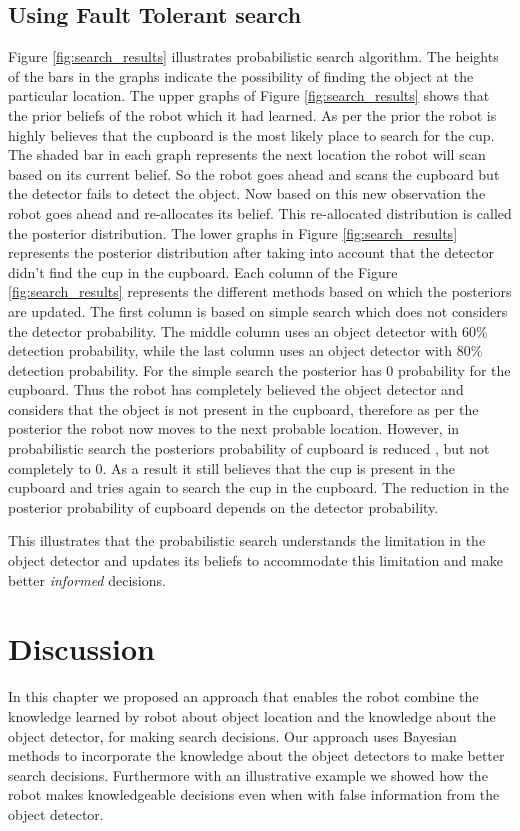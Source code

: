 \subsection{Using Fault Tolerant search}

Figure \ref{fig:search_results} illustrates probabilistic search algorithm. The heights of the bars in the graphs indicate the possibility of finding the object at the particular location. The upper graphs of Figure \ref{fig:search_results} shows that the prior beliefs of the robot which it had learned. As per the prior the robot is highly believes that the cupboard is the most likely place to search for the cup. The shaded bar in each graph represents the next location the robot will scan based on its current belief. So the robot goes ahead and scans the cupboard but the detector fails to detect the object. Now based on this new observation the robot goes ahead and re-allocates its belief. This re-allocated distribution is called the posterior distribution. The lower graphs in Figure \ref{fig:search_results} represents the posterior distribution after taking into account that the detector didn’t find the cup in the cupboard. Each column of the Figure \ref{fig:search_results} represents the different methods based on which the posteriors are updated. The first column is based on simple search which does not considers the detector probability. The middle column uses an object detector with 60\% detection probability, while the last column uses an object detector with 80\% detection probability. For the simple search the posterior has $0$ probability for the cupboard. Thus the robot has completely believed the object detector and considers that the object is not present in the cupboard, therefore as per the posterior the robot now moves to the next probable location. However, in probabilistic search the posteriors probability of cupboard is reduced , but not completely to $0$. As a result it still believes that the cup is present in the cupboard and tries again to search the cup in the cupboard. The reduction in the posterior probability of cupboard depends on the detector probability. 

This illustrates that the probabilistic search understands the limitation in the object detector and updates its beliefs to accommodate this limitation and make better \emph{informed} decisions.  


\section{Discussion}
In this chapter we proposed an approach that enables the robot combine the knowledge learned by robot about object location and the knowledge about the object detector, for making search decisions. Our approach uses Bayesian methods to incorporate the knowledge about the object detectors to make better search decisions. Furthermore with an illustrative example we showed how the robot makes knowledgeable decisions even when with false information from the object detector.
